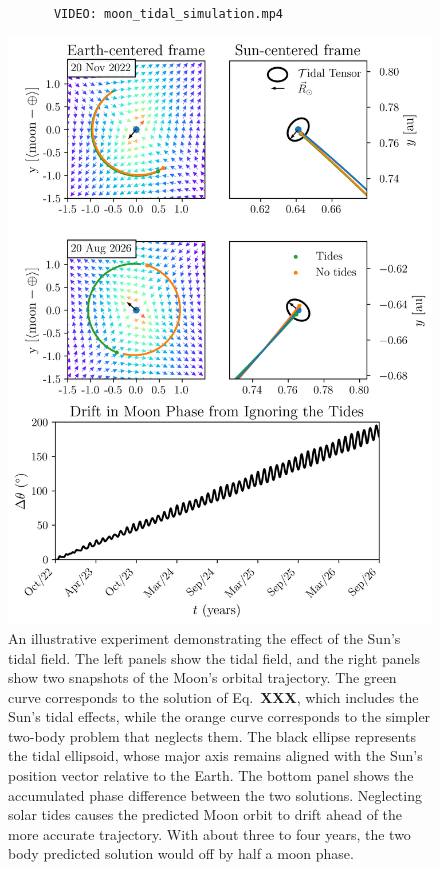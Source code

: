             
            
            \begin{verbatim}
            VIDEO: moon_tidal_simulation.mp4
            \end{verbatim}

            \begin{figure}
                \centering
                \includegraphics[width=\linewidth]{images/moon_tidal_simulation.png}
                \caption{An illustrative experiment demonstrating the effect of the Sun's tidal field. The left panels show the tidal field, and the right panels show two snapshots of the Moon's orbital trajectory. The green curve corresponds to the solution of Eq.~\textbf{XXX}, which includes the Sun's tidal effects, while the orange curve corresponds to the simpler two-body problem that neglects them. The black ellipse represents the tidal ellipsoid, whose major axis remains aligned with the Sun's position vector relative to the Earth. The bottom panel shows the accumulated phase difference between the two solutions. Neglecting solar tides causes the predicted Moon orbit to drift ahead of the more accurate trajectory. With about three to four years, the two body predicted solution would off by half a moon phase.
                }\label{fig:moon_tidal_simulation}
            \end{figure}

